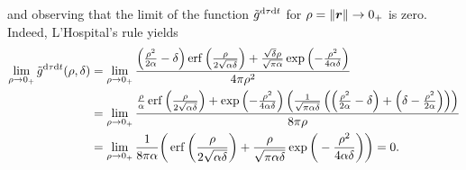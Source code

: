 \documentclass[a4paper,11pt]{article}
\begin{document}
and observing that the limit of the function $\tilde g^{{\mathrm{d}} \tau {\mathrm{d}} t}$ for $\rho = \| {{\bm{r}}}\| \rightarrow 0_+$ is zero. Indeed, L'Hospital's rule yields
\begin{align*}
	\lim_{\rho \rightarrow 0_+} \tilde g^{{\mathrm{d}} \tau {\mathrm{d}} t}(\rho,\delta) &=
	\lim_{\rho \rightarrow 0_+} \frac{
	\left(\frac{\rho^2}{2\alpha}-\delta \right) \operatorname{erf}\left(\frac{\rho}{2\sqrt{\alpha\delta}} \right)
	+ \frac{\sqrt{\delta} \rho}{\sqrt{\pi\alpha}} \exp \left( -\frac{\rho^2}{4 \alpha\delta} \right)}
	{4\pi \rho^2} \\ &= 
	\lim_{\rho \rightarrow 0_+} \frac{ \frac{\rho}{\alpha} \operatorname{erf}\left(\frac{\rho}{2\sqrt{\alpha\delta}}\right)
	+\exp\left(-\frac{\rho^2}{4\alpha\delta}\right) 
	\left( \frac{1}{\sqrt{\pi \alpha\delta}} \left(\left( \frac{\rho^2}{2\alpha} - \delta \right)
	+ \left( \delta - \frac{\rho^2}{2\alpha}\right) \right) \right)}
	{8 \pi \rho} \\
	&= \lim_{\rho \rightarrow 0_+}\frac{1}{8 \pi \alpha} \bigg( \operatorname{erf}\bigg( \frac{\rho}{2\sqrt{\alpha\delta}} \bigg) + \frac{\rho}{\sqrt{\pi\alpha\delta}} \exp\bigg(-\frac{\rho^2}{4\alpha\delta}\bigg)\bigg)  = 0.
\end{align*}
\end{document}
